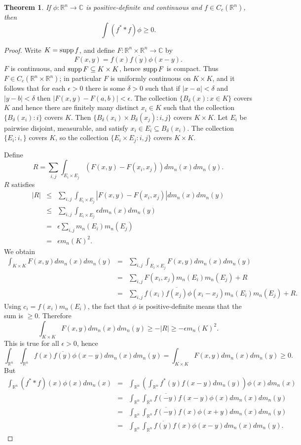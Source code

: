 \documentclass{article}
\newcommand{\supp}{\ensuremath\mathrm{supp}\,}
\newtheorem{theorem}{Theorem}
\theoremstyle{definition}
\begin{document}
\begin{theorem}
If $\phi:\mathbb{R}^n \to \mathbb{C}$ is positive-definite and continuous and $f \in C_c(\mathbb{R}^n)$, then
\[
\int (f^* * f) \phi \geq 0.
\]
\end{theorem}
\begin{proof}
Write $K=\supp f$, and
define $F:\mathbb{R}^n \times \mathbb{R}^n \to \mathbb{C}$ by 
\[
F(x,y)=f(x)\overline{f(y)} \phi(x-y).
\]
$F$ is continuous, and $\supp F \subseteq K \times K$, hence $\supp F$ is compact. Thus
$F \in C_c(\mathbb{R}^n \times \mathbb{R}^n)$; in particular $F$ is uniformly continuous on
$K \times K$, and it follows that  for each $\epsilon>0$ there is some $\delta>0$ such that 
if $|x-a|<\delta$ and $|y-b|<\delta$ then 
$|F(x,y)-F(a,b)|<\epsilon$. 
The collection $\{B_\delta(x) :x \in K\}$ covers
$K$ and hence 
there are finitely many distinct $x_i \in K$
such that
the collection $\{B_\delta(x_i): i\}$ covers $K$.
Then 
$\{B_\delta(x_i) \times B_\delta(x_j):i,j\}$ covers $K \times K$. 
Let $E_i$ be pairwise disjoint, measurable, and satisfy $x_i \in E_i  \subseteq B_\delta(x_i)$.
The collection $\{E_i:i,\}$
covers $K$, so the collection  
$\{E_i \times E_j:i,j\}$
covers $K \times K$. 

Define
\[
R =\sum_{i,j} \int_{E_i \times E_j}  (F(x,y)-F(x_i,x_j)) dm_n(x)dm_n(y).
\]
$R$ satisfies
\begin{eqnarray*}
|R|&\leq&\sum_{i,j} \int_{E_i \times E_j} | F(x,y)- F(x_i,x_j)| dm_n(x)dm_n(y)\\
&\leq&\sum_{i,j} \int_{E_i \times E_j} \epsilon dm_n(x)dm_n(y)\\
&=&\epsilon \sum_{i,j}m_n(E_i)m_n(E_j)\\
&=&\epsilon m_n(K)^2.
\end{eqnarray*}
We obtain
\begin{eqnarray*}
\int_{K \times K} F(x,y) dm_n(x) dm_n(y)&=&\sum_{i,j} \int_{E_i \times E_j} F(x,y) dm_n(x)dm_n(y)\\
&=&\sum_{i,j} F(x_i,x_j) m_n(E_i)m_n(E_j) +R\\
&=&\sum_{i,j} f(x_i)\overline{f(x_j)}\phi(x_i-x_j)m_n(E_i)m_n(E_j)+R.
\end{eqnarray*}
Using $c_i=f(x_i)m_n(E_i)$, the fact that $\phi$ is positive-definite means that the sum is $\geq 0$. Therefore
\[
\int_{K \times K} F(x,y) dm_n(x) dm_n(y) \geq -|R| \geq -\epsilon m_n(K)^2.
\]
This is true for all $\epsilon>0$, hence 
\[
\int_{\mathbb{R}^n} \int_{\mathbb{R}^n} f(x)\overline{f(y)} \phi(x-y) dm_n(x)dm_n(y) = \int_{K \times K}
F(x,y) dm_n(x)dm_n(y) \geq 0.
\]
But
\begin{eqnarray*}
\int_{\mathbb{R}^n} (f^* * f)(x) \phi(x) dm_n(x)&=&\int_{\mathbb{R}^n} \left(\int_{\mathbb{R}^n} f^*(y)f(x-y) dm_n(y)\right) \phi(x) dm_n(x)\\
&=&\int_{\mathbb{R}^n} \int_{\mathbb{R}^n} \overline{f(-y)} f(x-y) \phi(x) dm_n(x) dm_n(y)\\
&=&\int_{\mathbb{R}^n} \int_{\mathbb{R}^n}  \overline{f(-y)} f(x) \phi(x+y) dm_n(x)dm_n(y)\\
&=&\int_{\mathbb{R}^n} \int_{\mathbb{R}^n}  \overline{f(y)} f(x) \phi(x-y) dm_n(x)dm_n(y).
\end{eqnarray*}
\end{proof}
\end{document}
